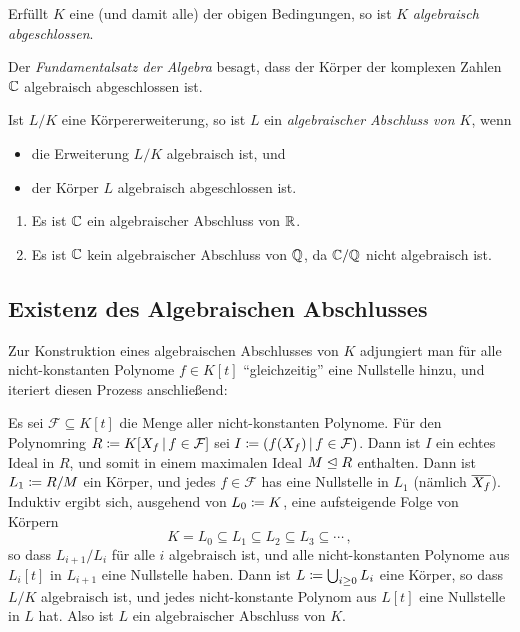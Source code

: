 \begin{definition}
  Erfüllt $K$ eine \textup(und damit alle\textup) der obigen Bedingungen, so ist $K$ \emph{algebraisch abgeschlossen}.
\end{definition}

\begin{example}
  Der \emph{Fundamentalsatz der Algebra} besagt, dass der Körper der komplexen Zahlen $\mathbb{C}$ algebraisch abgeschlossen ist.
\end{example}

\begin{definition}
  Ist $L/K$ eine Körpererweiterung, so ist $L$ ein \emph{algebraischer Abschluss von $K$}, wenn
  \begin{itemize}
    \item
      die Erweiterung $L/K$ algebraisch ist, und
    \item
      der Körper $L$ algebraisch abgeschlossen ist.
  \end{itemize}
\end{definition}

\begin{example}
  \begin{enumerate}
    \item
      Es ist $\mathbb{C}$ ein algebraischer Abschluss von $\mathbb{R}$.
    \item
      Es ist $\mathbb{C}$ kein algebraischer Abschluss von $\mathbb{Q}$, da $\mathbb{C}/\mathbb{Q}$ nicht algebraisch ist.
  \end{enumerate}
\end{example}



\subsection{Existenz des Algebraischen Abschlusses}

Zur Konstruktion eines algebraischen Abschlusses von $K$ adjungiert man für alle nicht-konstanten Polynome $f \in K[t]$ \enquote{gleichzeitig} eine Nullstelle hinzu, und iteriert diesen Prozess anschließend:

Es sei $\mathcal{F} \subseteq K[t]$ die Menge aller nicht-konstanten Polynome.
Für den Polynomring $R \defined K[X_f \suchthat f \in \mathcal{F}]$ sei $I \defined \genideal{f(X_f) \suchthat f \in \mathcal{F}}$.
Dann ist $I$ ein echtes Ideal in $R$, und somit in einem maximalen Ideal $M \mathrel{\trianglelefteq} R$ enthalten.
Dann ist $L_1 \coloneqq R/M$ ein Körper, und jedes $f \in \mathcal{F}$ has eine Nullstelle in $L_1$ (nämlich $\overline{X_f}$).
Induktiv ergibt sich, ausgehend von $L_0 \coloneqq K$, eine aufsteigende Folge von Körpern
\[
            K
  =         L_0
  \subseteq L_1
  \subseteq L_2
  \subseteq L_3
  \subseteq \dotsb \,,
\]
so dass $L_{i+1}/L_i$ für alle $i$ algebraisch ist, und alle nicht-konstanten Polynome aus $L_i[t]$ in $L_{i+1}$ eine Nullstelle haben.
Dann ist $L \coloneqq \bigcup_{i \geq 0} L_i$ eine Körper, so dass $L/K$ algebraisch ist, und jedes nicht-konstante Polynom aus $L[t]$ eine Nullstelle in $L$ hat.
Also ist $L$ ein algebraischer Abschluss von $K$.

